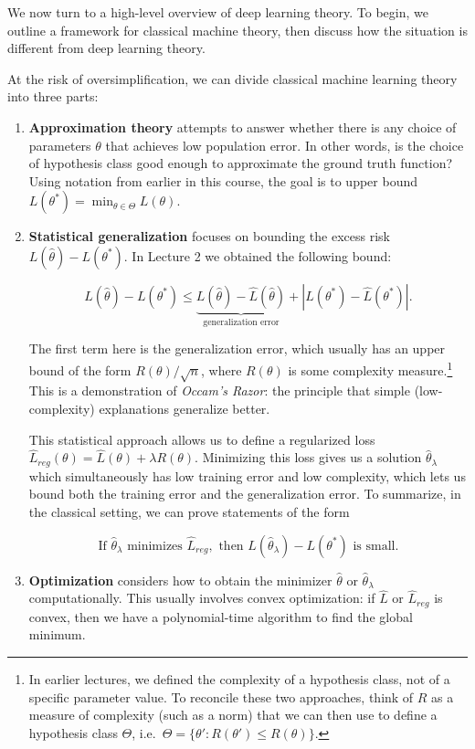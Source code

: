 
We now turn to a high-level overview of deep learning theory. To begin, we outline a framework for classical machine theory, then discuss how the situation is different from deep learning theory.

At the risk of oversimplification, we can divide classical machine learning theory into three parts:

\begin{enumerate}
\item {\bf Approximation theory} attempts to answer whether there is any choice of parameters $\theta$ that achieves low population error. In other words, is the choice of hypothesis class good enough to approximate the ground truth function? Using notation from earlier in this course, the goal is to upper bound $L(\theta^*) = \min_{\theta \in \Theta} L(\theta).$
    
\item {\bf Statistical generalization} focuses on bounding the excess risk $L(\hat{\theta}) - L(\theta^*)$. In Lecture 2 we obtained the following bound:
    
\begin{equation}
L(\hat{\theta})-L(\theta^*)\leq \underbrace{L(\hat{\theta})-\hat{L}(\hat{\theta})}_{\text{generalization error}} + |L(\theta^*)-\hat{L}(\theta^*)|.
\end{equation}
    
The first term here is the generalization error, which usually has an upper bound of the form $R(\theta)/\sqrt{n}$, where $R(\theta)$ is some complexity measure.\footnote{In earlier lectures, we defined the complexity of a hypothesis class, not of a specific parameter value. To reconcile these two approaches, think of $R$ as a measure of complexity (such as a norm) that we can then use to define a hypothesis class $\Theta$, i.e.~$\Theta = \{\theta' : R(\theta') \le R(\theta)\}$.} This is a demonstration of \textit{Occam's Razor}: the principle that simple (low-complexity) explanations generalize better. 
    
This statistical approach allows us to define a regularized loss  $\hat{L}_{reg}(\theta)=\hat{L}(\theta)+\lambda R(\theta)$. Minimizing this loss gives us a solution $\hat{\theta}_\lambda$ which simultaneously has low training error and low complexity, which lets us bound both the training error and the generalization error. To summarize, in the classical setting, we can prove statements of the form
    
\begin{equation}\label{lec9:eqn:classical-guarantee}
\text{If }\hat{\theta}_\lambda \text{ minimizes } \hat{L}_{reg},\text{ then } L(\hat{\theta}_\lambda) - L(\theta^*) \text{ is small.}
\end{equation}
    
\item {\bf Optimization} considers how to obtain the minimizer $\hat\theta$ or $\hat{\theta}_\lambda$ computationally. This usually involves convex optimization: if $\hat{L}$ or $\hat{L}_{reg}$ is convex, then we have a polynomial-time algorithm to find the global minimum.
\end{enumerate}

